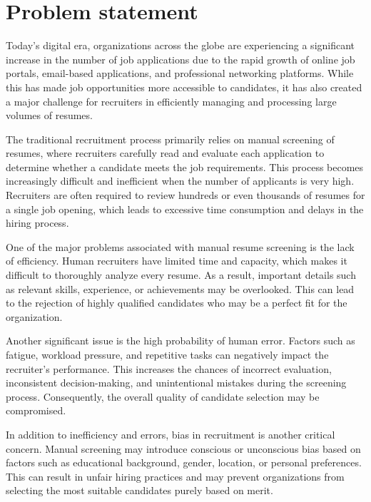 \section{Problem statement}
\vspace{6pt}
{%
Today’s digital era, organizations across the globe are experiencing a significant increase in the number of job applications due to the rapid growth of online job portals, email-based applications, and professional networking platforms. While this has made job opportunities more accessible to candidates, it has also created a major challenge for recruiters in efficiently managing and processing large volumes of resumes.}

\vspace{6pt}
{%
The traditional recruitment process primarily relies on manual screening of resumes, where recruiters carefully read and evaluate each application to determine whether a candidate meets the job requirements. This process becomes increasingly difficult and inefficient when the number of applicants is very high. Recruiters are often required to review hundreds or even thousands of resumes for a single job opening, which leads to excessive time consumption and delays in the hiring process.}

\vspace{6pt}
{%
One of the major problems associated with manual resume screening is the lack of efficiency. Human recruiters have limited time and capacity, which makes it difficult to thoroughly analyze every resume. As a result, important details such as relevant skills, experience, or achievements may be overlooked. This can lead to the rejection of highly qualified candidates who may be a perfect fit for the organization.}

\vspace{6pt}
{%
Another significant issue is the high probability of human error. Factors such as fatigue, workload pressure, and repetitive tasks can negatively impact the recruiter’s performance. This increases the chances of incorrect evaluation, inconsistent decision-making, and unintentional mistakes during the screening process. Consequently, the overall quality of candidate selection may be compromised.}


\vspace{6pt}
{%
In addition to inefficiency and errors, bias in recruitment is another critical concern. Manual screening may introduce conscious or unconscious bias based on factors such as educational background, gender, location, or personal preferences. This can result in unfair hiring practices and may prevent organizations from selecting the most suitable candidates purely based on merit.}


